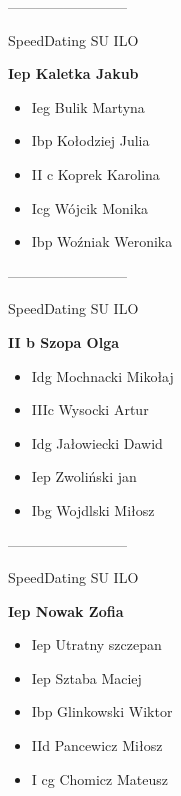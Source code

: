 \documentclass[a4paper,10pt]{article}
\begin{document}
\begin{multicols}{3}
\begin{minipage}[l]{\textwidth}
\begin{itemize}
    \end{itemize}



\end{minipage}



\begin{minipage}[l]{\textwidth}
--------------------------

  \footnotesize{SpeedDating SU ILO}

  \bfseries{Iep Kaletka Jakub}

  \begin{itemize}
    \item Ieg Bulik Martyna
    \item Ibp Kołodziej Julia
    \item II c Koprek Karolina
    \item Icg Wójcik Monika
    \item Ibp Woźniak Weronika

    \end{itemize}



\end{minipage}



\begin{minipage}[l]{\textwidth}
--------------------------

  \footnotesize{SpeedDating SU ILO}

  \bfseries{II b Szopa Olga}

  \begin{itemize}
    \item Idg Mochnacki Mikołaj
    \item IIIc Wysocki Artur
    \item Idg Jałowiecki Dawid
    \item Iep Zwoliński jan
    \item Ibg Wojdlski Miłosz

    \end{itemize}



\end{minipage}



\begin{minipage}[l]{\textwidth}
--------------------------

  \footnotesize{SpeedDating SU ILO}

  \bfseries{Iep Nowak Zofia}

  \begin{itemize}
    \item Iep Utratny szczepan
    \item Iep Sztaba Maciej
    \item Ibp Glinkowski Wiktor
    \item IId Pancewicz Miłosz
    \item I cg Chomicz Mateusz


\end{itemize}
\end{minipage}
\end{multicols}
\end{document}
